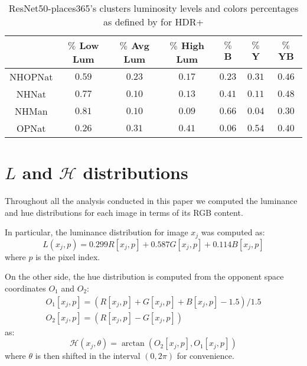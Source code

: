 \documentclass[12pt]{spieman}  %
\begin{document}
\begin{spacing}{2}
\begin{linenumbers}
\begin{table}[!t]
	\renewcommand{\arraystretch}{1.3}
	\caption{ResNet50-places365's clusters luminosity levels and colors percentages as defined by \clustname for HDR+ }
	\centering
	\begin{tabular}{c||c|c|c|c|c|c}
		\hline
		& $\%$ Low Lum & $\%$ Avg Lum & $\%$ High Lum & $\%$ B  & $\%$ Y & $\%$ YB \\ 
		\hline\hline
		NHOPNat & $0.59$ & $0.23$  & $0.17$  & $0.23$  & $0.31$  & $0.46$\\
		\hline
		NHNat & $0.77$ & $0.10$  & $0.13$  & $0.41$  & $0.11$  & $0.48$\\
		\hline
		NHMan  & $0.81$ & $0.10$  & $0.09$  & $0.66$  & $0.04$  & $0.30$\\
		\hline
		OPNat & $0.26$ & $0.31$  & $0.41$  & $0.06$  & $0.54$  & $0.40$\\
		\hline
	\end{tabular}
	\label{table:scenes_cluster_luminosity_hdrplus}
\end{table}



\section{$L$ and $\mathcal{H}$ distributions}
\label{app:lum_hue_distr}

Throughout all the analysis conducted in this paper we computed the luminance and hue distributions for each image in terms of its RGB content.

In particular, the luminance distribution for image $x_j$ was computed as:
\begin{equation}
	L(x_j, p)  = 0.299 R[x_j, p] + 0.587  G[x_j, p] + 0.114  B[x_j, p]
	\label{eq:lum_rgb}
\end{equation} 
where $p$ is the pixel index.


On the other side, the hue distribution is computed from the opponent space coordinates $O_1$ and $O_2$:
\begin{equation}
		\begin{split}
			O_1[x_j, p] = \left ( R[x_j, p] + G[x_j, p] + B[x_j, p] - 1.5 \right ) / 1.5 \\
			O_2[x_j, p] = \left ( R[x_j, p] - G[x_j, p] \right )
		\end{split}
	\label{eq:opp_space_def}
\end{equation}
as: 
\begin{equation}
	\mathcal{H}(x_j, \theta) = \arctan(O_2[x_j, p], O_1[x_j, p])
	\label{eq:hue_def}
\end{equation}
where $\theta$ is then shifted in the interval $\left ( 0, 2 \pi \right )$ for convenience. 
 

\end{linenumbers}
\end{spacing}
\end{document}
